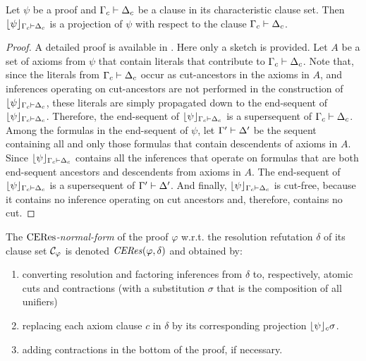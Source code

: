 \begin{theorem}
Let $\psi$ be a proof and $\Gamma_c \vdash \Delta_c$ be a clause in its characteristic clause set. Then $\lfloor \psi \rfloor_{\Gamma_c \vdash \Delta_c}$ is a projection of $\psi$ with respect to the clause $\Gamma_c \vdash \Delta_c$.
\end{theorem}
\begin{proof}
A detailed proof is available in \cite{ToDo}. Here only a sketch is provided. Let $A$ be a set of axioms from $\psi$ that contain literals that contribute to $\Gamma_c \vdash \Delta_c$. Note that, since the literals from $\Gamma_c \vdash \Delta_c$ occur as cut-ancestors in the axioms in $A$, and inferences operating on cut-ancestors are not performed in the construction of $\lfloor \psi \rfloor_{\Gamma_c \vdash \Delta_c}$, these literals are simply propagated down to the end-sequent of $\lfloor \psi \rfloor_{\Gamma_c \vdash \Delta_c}$. Therefore, the end-sequent of $\lfloor \psi \rfloor_{\Gamma_c \vdash \Delta_c}$ is a supersequent of $\Gamma_c \vdash \Delta_c$. Among the formulas in the end-sequent of $\psi$, let $\Gamma' \vdash \Delta'$ be the sequent containing all and only those formulas that contain descendents of axioms in $A$. Since $\lfloor \psi \rfloor_{\Gamma_c \vdash \Delta_c}$ contains all the inferences that operate on formulas that are both end-sequent ancestors and descendents from axioms in $A$. The end-sequent of $\lfloor \psi \rfloor_{\Gamma_c \vdash \Delta_c}$ is a supersequent of $\Gamma' \vdash \Delta'$. And finally, $\lfloor \psi \rfloor_{\Gamma_c \vdash \Delta_c}$ is cut-free, because it contains no inference operating on cut ancestors and, therefore, contains no cut.
\end{proof}


\begin{definition}
The \emph{$\mathrm{CERes}$-normal-form} of the proof $\varphi$ w.r.t. the resolution refutation $\delta$ of its clause set $\mathcal{C}_{\varphi}$ is denoted $\mathit{CERes}(\varphi,\delta)$ and obtained by:
\begin{enumerate}
\item converting resolution and factoring inferences from $\delta$ to, respectively, atomic cuts and contractions (with a substitution $\sigma$ that is the composition of all unifiers)
\item replacing each axiom clause $c$ in $\delta$ by its corresponding projection $\lfloor \psi \rfloor_{c} \sigma$.
\item adding contractions in the bottom of the proof, if necessary.
\end{enumerate} 
\end{definition}



